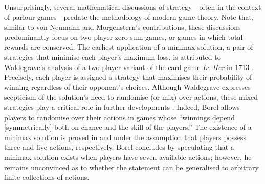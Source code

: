     Unsurprisingly, several mathematical discussions of strategy---often in the context of parlour games---predate the methodology of modern game theory.
    Note that, similar to von Neumann and Morgenstern's \parencite{vonNeumann2004} contributions, these discussions predominantly focus on two-player zero-sum games, or games in which total rewards are conserved.
    The earliest application of a minimax solution, a pair of strategies that minimise each player's maximum loss, is attributed to Waldegrave's analysis of a two-player variant of the card game \textit{Le Her} in 1713 \parencite{Dimand1992}.
    Precisely, each player is assigned a strategy that maximises their probability of winning regardless of their opponent's choices.
    Although Waldegrave expresses scepticism of the solution's need to randomise (or mix) over actions, these mixed strategies play a critical role in further developments \parencite{Dimand1992}.
    Indeed, Borel \parencite{Borel1921} allows players to randomise over their actions in games whose ``winnings depend [symmetrically] both on chance and the skill of the players.''
    The existence of a minimax solution is proved in \parencite{Borel1921} and \parencite{Borel1924} under the assumption that players possess three and five actions, respectively.
    Borel \parencite{Borel1927} concludes by speculating that a minimax solution exists when players have seven available actions; however, he remains unconvinced as to whether the statement can be generalised to arbitrary finite collections of actions.

